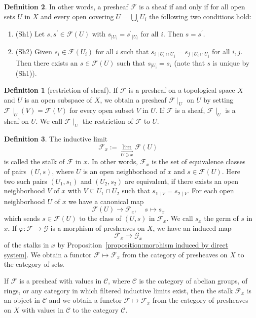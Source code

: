 \documentclass[12pt,a4paper]{book}
\newenvironment{enu}{\begin{enumerate}[(1)]}{\end{enumerate}}
\theoremstyle{definition}
\newtheorem{defn}{Definition}[section]
\begin{document}
\begin{defn}
    In other words, a presheaf $\mathscr{F}$ is a sheaf if and only if for all open sets $U$ in $X$ and every open covering $U=\bigcup_i U_i$ the following two conditions hold:
    \begin{enu}
        \item (Sh1) Let $s, s^{\prime} \in \mathscr{F}(U)$ with $s_{\mid U_i}=s^{\prime}{ }_{\mid U_i}$ for all $i$. Then $s=s^{\prime}$.
        \item (Sh2) Given $s_i \in \mathscr{F}\left(U_i\right)$ for all $i$ such that $s_{i \mid U_i \cap U_j}=s_{j \mid U_i \cap U_j}$ for all $i, j$. Then there exists an $s \in \mathscr{F}(U)$ such that $s_{\mid U_i}=s_i$ (note that $s$ is unique by (Sh1)).
    \end{enu}
    \begin{defn}[restriction of sheaf]
        If $\mathscr{F}$ is a presheaf on a topological space $X$ and $U$ is an open subspace of $X$,
        we obtain a presheaf $\mathscr{F}\mid_U$ on $U$ by setting $\mathscr{F}\mid_U(V)=\mathscr{F}(V)$ for every open subset $V$ in $U$.
        If $\mathscr{F}$ is a sheaf, $\mathscr{F}\mid_U$ is a sheaf on $U$. We call $\mathscr{F} \mid_U$ the restriction of $\mathscr{F}$ to $U$.
    \end{defn}
\end{defn}
\begin{defn}
    The inductive limit
    $$
        \mathscr{F}_x:=\underset{\overrightarrow{U \ni x}}{\lim } \mathscr{F}(U)
    $$
    is called the stalk of $\mathscr{F}$ in $x$.
    In other words, $\mathscr{F}_x$ is the set of equivalence classes of pairs $(U, s)$, where $U$ is an open neighborhood of $x$ and $s \in \mathscr{F}(U)$. Here two such pairs $\left(U_1, s_1\right)$ and $\left(U_2, s_2\right)$ are equivalent, if there exists an open neighborhood $V$ of $x$ with $V \subseteq U_1 \cap U_2$ such that $s_{1 \mid V}=s_{2 \mid V}$.
    For each open neighborhood $U$ of $x$ we have a canonical map
    $$
        \mathscr{F}(U) \rightarrow \mathscr{F}_x, \quad s \mapsto s_x
    $$
    which sends $s \in \mathscr{F}(U)$ to the class of $(U, s)$ in $\mathscr{F}_x$. We call $s_x$ the germ of $s$ in $x$.
    If $\varphi: \mathscr{F} \rightarrow \mathscr{G}$ is a morphism of presheaves on $X$, we have an induced map
    $$
        \mathscr{F}_x\rightarrow \mathscr{G}_x
    $$
    of the stalks in $x$ by Proposition~\ref{proposition:morphism induced by direct system}. We obtain a functor $\mathscr{F} \mapsto \mathscr{F}_x$ from the category of presheaves on $X$ to the category of sets.

    If $\mathscr{F}$ is a presheaf with values in $\mathcal{C}$, where $\mathcal{C}$ is the category of abelian groups, of rings, or any category in which filtered inductive limits exist, then the stalk $\mathscr{F}_x$ is an object in $\mathcal{C}$ and we obtain a functor $\mathscr{F} \mapsto \mathscr{F}_x$ from the category of presheaves on $X$ with values in $\mathcal{C}$ to the category $\mathcal{C}$.
\end{defn}
\end{document}
